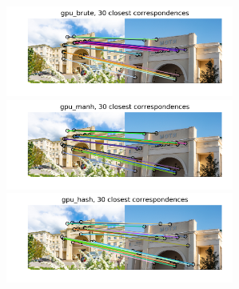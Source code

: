 \documentclass[aspectratio=169]{beamer}
\newcommand{\wid}{7.5cm}
\begin{document}
\begin{frame}
\begin{figure}
	\centering
	\begin{minipage}{\wid}
		
		\includegraphics[width=\wid]{corresp_gpu_brute_4-5.png}
	\end{minipage}
	\hfill
	\begin{minipage}{\wid}
		
		\includegraphics[width=\wid]{corresp_gpu_manh_4-5.png}
	\end{minipage}
	\hfill
	\begin{minipage}{\wid}
		
		\includegraphics[width=\wid]{corresp_gpu_hash_4-5.png}
	\end{minipage}
\end{figure}
\end{frame}
\end{document}
